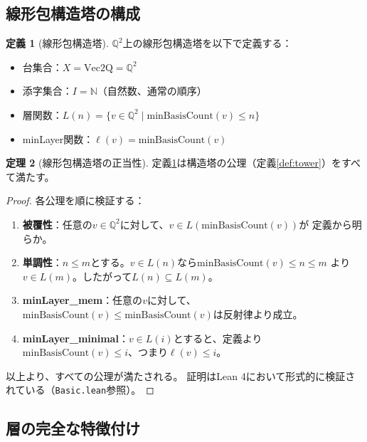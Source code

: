 \documentclass[a4paper,12pt]{ltjsarticle}
\theoremstyle{definition}
\newtheorem{definition}{定義}[section]
\newtheorem{theorem}[definition]{定理}
\begin{document}
\subsection{線形包構造塔の構成}

\begin{definition}[線形包構造塔]\label{def:linearSpanTower}
$\mathbb{Q}^2$上の線形包構造塔を以下で定義する：
\begin{itemize}
\item 台集合：$X = \mathrm{Vec2Q} = \mathbb{Q}^2$
\item 添字集合：$I = \mathbb{N}$（自然数、通常の順序）
\item 層関数：$L(n) = \{v \in \mathbb{Q}^2 \mid \mathrm{minBasisCount}(v) \leq n\}$
\item minLayer関数：$\ell(v) = \mathrm{minBasisCount}(v)$
\end{itemize}
\end{definition}

\begin{theorem}[線形包構造塔の正当性]
定義\ref{def:linearSpanTower}は構造塔の公理（定義\ref{def:tower}）をすべて満たす。
\end{theorem}

\begin{proof}
各公理を順に検証する：

\begin{enumerate}
\item \textbf{被覆性}：任意の$v \in \mathbb{Q}^2$に対して、$v \in L(\mathrm{minBasisCount}(v))$が
定義から明らか。

\item \textbf{単調性}：$n \leq m$とする。$v \in L(n)$なら$\mathrm{minBasisCount}(v) \leq n \leq m$
より$v \in L(m)$。したがって$L(n) \subseteq L(m)$。

\item \textbf{minLayer\_mem}：任意の$v$に対して、
$\mathrm{minBasisCount}(v) \leq \mathrm{minBasisCount}(v)$は反射律より成立。

\item \textbf{minLayer\_minimal}：$v \in L(i)$とすると、定義より
$\mathrm{minBasisCount}(v) \leq i$、つまり$\ell(v) \leq i$。
\end{enumerate}

以上より、すべての公理が満たされる。
証明はLean 4において形式的に検証されている（\texttt{Basic.lean}参照）。
\end{proof}

\subsection{層の完全な特徴付け}
\end{document}

